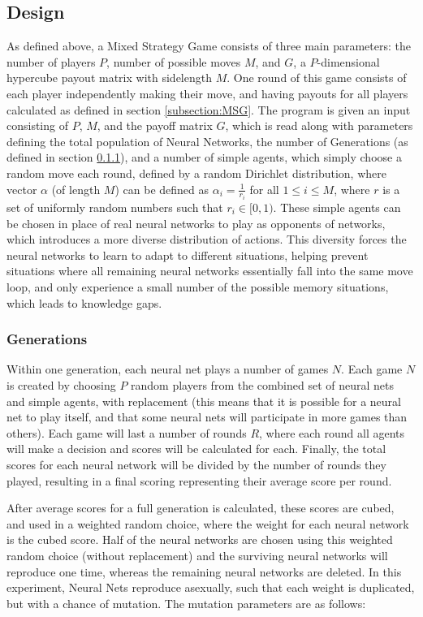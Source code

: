 \documentclass{article}
\begin{document}
\subsection{Design}
\label{section:DES}
As defined above, a Mixed Strategy Game consists of three main parameters: the number of players $P$, number of possible moves $M$, and $G$, a $P$-dimensional hypercube payout matrix with sidelength $M$. One round of this game consists of each player independently making their move, and having payouts for all players calculated as defined in section \ref{subsection:MSG}. The program is given an input consisting of $P$, $M$, and the payoff matrix $G$, which is read along with parameters defining the total population of Neural Networks, the number of Generations (as defined in section \ref{subsection:GENS}), and a number of simple agents, which simply choose a random move each round, defined by a random Dirichlet distribution, where vector $\alpha$ (of length $M$) can be defined as $\alpha_i = \frac{1}{r_i}$ for all $1\leq i \leq M$, where $r$ is a set of uniformly random numbers such that $r_i\in[0,1)$. These simple agents can be chosen in place of real neural networks to play as opponents of networks, which introduces a more diverse distribution of actions. This diversity forces the neural networks to learn to adapt to different situations, helping prevent situations where all remaining neural networks essentially fall into the same move loop, and only experience a small number of the possible memory situations, which leads to knowledge gaps.

\subsubsection{Generations}
\label{subsection:GENS}
Within one generation, each neural net plays a number of games $N$. Each game $N$ is created by choosing $P$ random players from the combined set of neural nets and simple agents, with replacement (this means that it is possible for a neural net to play itself, and that some neural nets will participate in more games than others). Each game will last a number of rounds $R$, where each round all agents will make a decision and scores will be calculated for each. Finally, the total scores for each neural network will be divided by the number of rounds they played, resulting in a final scoring representing their average score per round.

After average scores for a full generation is calculated, these scores are cubed, and used in a weighted random choice, where the weight for each neural network is the cubed score. Half of the neural networks are chosen using this weighted random choice (without replacement) and the surviving neural networks will reproduce one time, whereas the remaining neural networks are deleted. In this experiment, Neural Nets reproduce asexually, such that each weight is duplicated, but with a chance of mutation. The mutation parameters are as follows:
\end{document}
